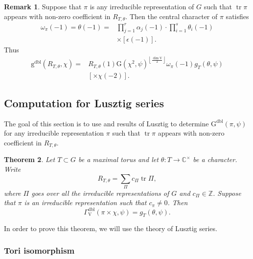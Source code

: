 \documentclass[12pt, reqno]{amsart}
\newtheorem{theorem}{Theorem}[section]
\theoremstyle{definition}
\theoremstyle{definition}
\newtheorem{remark}[theorem]{Remark}
\theoremstyle{definition}
\newcommand{\zIntegers}{\mathbb{Z}}
\newcommand{\cComplex}{\mathbb{C}}
\newcommand{\multiplicativegroup}[1]{#1^{\times}}
\newcommand{\hermitianSpace}{\mathrm{V}}
\newcommand{\fieldCharacter}{\psi}
\newcommand{\centralCharacter}[1]{\omega_{#1}}
\newcommand{\trace}{\operatorname{tr}}
\newcommand{\GaussSumScalar}[2]{\mathrm{G}\left(#1, #2\right)}
\newcommand{\dblGaussSumScalar}[2]{\mathrm{G}^{\mathrm{dbl}}\left(#1, #2\right)}
\newcommand{\dblVirtualGaussSumScalar}[2]{\mathrm{g}^{\mathrm{dbl}}\left(#1, #2\right)}
\newcommand{\dblGammaFactorSpace}[4]{\Gamma^{\mathrm{dbl}}_{#1}\left(#2 \times #3, #4\right)}
\begin{document}
\begin{remark}
	Suppose that $\pi$ is any irreducible representation of $G$ such that $\trace \pi$ appears with non-zero coefficient in $R_{T,\theta}$. Then the central character of $\pi$ satisfies
	\begin{align*}
		\centralCharacter{\pi}\left(-1\right) = \theta\left(-1\right) =& \prod_{j=1}^r \alpha_j\left(-1\right) \cdot \prod_{i=1}^s \theta_i\left(-1\right)\\
		& \times \left[\epsilon\left(-1\right)\right].
	\end{align*}
	Thus \begin{align*}
		\dblVirtualGaussSumScalar{R_{T, \theta}}{\chi} =& R_{T,\theta}\left(1\right) \GaussSumScalar{\chi^2}{\fieldCharacter}^{\left\lfloor\frac{\dim \hermitianSpace}{2}\right\rfloor} \centralCharacter{\pi}\left(-1\right) g_T\left(\theta, \fieldCharacter\right) \\
		& \left[\times \chi\left(-2\right)\right].
	\end{align*}
\end{remark}

\subsection{Computation for Lusztig series}

The goal of this section is to use  and results of Lusztig to determine $\dblGaussSumScalar{\pi}{\fieldCharacter}$ for any irreducible representation $\pi$ such that $\trace \pi$ appears with non-zero coefficient in $R_{T,\theta}$.

\begin{theorem}
	Let $T \subset G$ be a maximal torus and let $\theta \colon T \to \multiplicativegroup{\cComplex}$ be a character. Write $$R_{T,\theta} = \sum_{\Pi} c_{\Pi} \trace \Pi,$$
	where $\Pi$ goes over all the irreducible representations of $G$ and $c_{\Pi} \in \zIntegers$. Suppose that $\pi$ is an irreducible representation such that $c_{\pi} \ne 0$. Then $$\dblGammaFactorSpace{\hermitianSpace}{\pi}{\chi}{\fieldCharacter} = g_T\left(\theta, \fieldCharacter\right).$$
\end{theorem}
In order to prove this theorem, we will use the theory of Lusztig series.

\subsubsection{Tori isomorphism}
\end{document}
